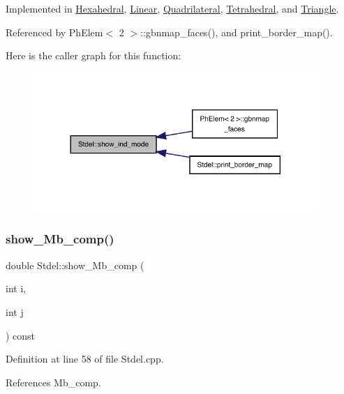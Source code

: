 Implemented in \hyperlink{classHexahedral_a3a21196cfe9b317868868985f33aa425}{Hexahedral}, \hyperlink{classLinear_a6de1b726827024c428333e79df48e866}{Linear}, \hyperlink{classQuadrilateral_a346c5ac301c7ffad41ea7278fe45c45b}{Quadrilateral}, \hyperlink{classTetrahedral_a932c2c79e4563d36612215bbdac42a39}{Tetrahedral}, and \hyperlink{classTriangle_ac61acf91a02fd588a70bf75d3e246129}{Triangle}.



Referenced by Ph\+Elem$<$ 2 $>$\+::gbnmap\+\_\+faces(), and print\+\_\+border\+\_\+map().

Here is the caller graph for this function\+:
\nopagebreak
\begin{figure}[H]
\begin{center}
\leavevmode
\includegraphics[width=305pt]{classStdel_aa97cf7534697be1f2e02ff540ed7433b_icgraph}
\end{center}
\end{figure}
\mbox{\label{classStdel_a4860f0f650640f859c5f75c206ee1f60}} 
\subsubsection{\texorpdfstring{show\+\_\+\+Mb\+\_\+comp()}{show\_Mb\_comp()}}
{\footnotesize\ttfamily double Stdel\+::show\+\_\+\+Mb\+\_\+comp (\begin{DoxyParamCaption}\item[{int}]{i,  }\item[{int}]{j }\end{DoxyParamCaption}) const}



Definition at line 58 of file Stdel.\+cpp.



References Mb\+\_\+comp.



